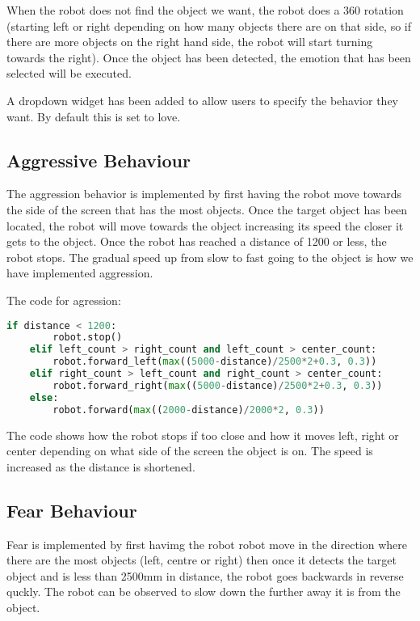 When the robot does not find the object we want, the robot does a 360 rotation (starting left or right depending on how many objects there are on that side, so if there are more objects on the right hand side, the robot will start turning  towards the right). Once the object has been detected, the emotion that has been selected will be executed.

A dropdown widget has been added to allow users to specify the behavior they want. By default this is set to love.

\subsection{Aggressive Behaviour}
The aggression behavior is implemented by first having the robot move towards the side of the screen that has the most objects. Once the target object has been located, the robot will move towards the object increasing its speed the closer it gets to the object. Once the robot has reached a distance of 1200 or less, the robot stops. The gradual speed up from slow to fast going to the object is how we have implemented aggression. 

The code for agression: 
   
\begin{lstlisting}[language=Python]
    if distance < 1200:
        robot.stop()
    elif left_count > right_count and left_count > center_count:
        robot.forward_left(max((5000-distance)/2500*2+0.3, 0.3))
    elif right_count > left_count and right_count > center_count:
        robot.forward_right(max((5000-distance)/2500*2+0.3, 0.3))
    else:
        robot.forward(max((2000-distance)/2000*2, 0.3))
\end{lstlisting}

The code shows how the robot stops if too close and how it moves left, right or center depending on what side of the screen the object is on. The speed is increased as the distance is shortened. 


\subsection{Fear Behaviour}
Fear is implemented by first havimg the robot robot move in the direction where there are the most objects (left, centre or right) then once it detects the target object and is less than 2500mm in distance, the robot goes backwards in reverse quckly. The robot can be observed to slow down the further away it is from the object. 

